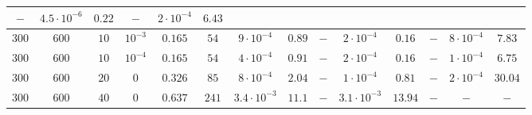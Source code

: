 \documentclass[twocolumn]{svjour3}
\begin{document}
\begin{table*}[!htp]
\begin{center}
\begin{tabular}{|c|c|c|c|c|c|c|c|c|c|c|c|c|c|}
\multicolumn{1}{|c}{$-$} & \multicolumn{1}{c}{$4.5\cdot10^{-6}$} & \multicolumn{1}{c|}{$0.22$} &
\multicolumn{1}{|c}{$-$} & \multicolumn{1}{c}{$2\cdot10^{-4}$} & \multicolumn{1}{c}{$6.43$} \\
\hline
\multicolumn{1}{c}{$300$} & \multicolumn{1}{c}{$600$} & \multicolumn{1}{c}{$10$} & \multicolumn{1}{c|}{$10^{-3}$} & $0.165$ & 
\multicolumn{1}{|c}{$54$} & \multicolumn{1}{c}{$9\cdot 10^{-4}$} & \multicolumn{1}{c|}{$0.89$} &
\multicolumn{1}{|c}{$-$} & \multicolumn{1}{c}{$2\cdot10^{-4}$} & \multicolumn{1}{c|}{$0.16$} &
\multicolumn{1}{|c}{$-$} & \multicolumn{1}{c}{$8\cdot10^{-4}$} & \multicolumn{1}{c}{$7.83$} \\
\hline
\multicolumn{1}{c}{$300$} & \multicolumn{1}{c}{$600$} & \multicolumn{1}{c}{$10$} & \multicolumn{1}{c|}{$10^{-4}$} & $0.165$ & 
\multicolumn{1}{|c}{$54$} & \multicolumn{1}{c}{$4\cdot 10^{-4}$} & \multicolumn{1}{c|}{$0.91$} &
\multicolumn{1}{|c}{$-$} & \multicolumn{1}{c}{$2\cdot10^{-4}$} & \multicolumn{1}{c|}{$0.16$} &
\multicolumn{1}{|c}{$-$} & \multicolumn{1}{c}{$1\cdot10^{-4}$} & \multicolumn{1}{c}{$6.75$} \\
\hline
\multicolumn{1}{c}{$300$} & \multicolumn{1}{c}{$600$} & \multicolumn{1}{c}{$20$} & \multicolumn{1}{c|}{$0$} & $0.326$ & 
\multicolumn{1}{|c}{$85$} & \multicolumn{1}{c}{$8\cdot 10^{-4}$} & \multicolumn{1}{c|}{$2.04$} &
\multicolumn{1}{|c}{$-$} & \multicolumn{1}{c}{$1\cdot10^{-4}$} & \multicolumn{1}{c|}{$0.81$} &
\multicolumn{1}{|c}{$-$} & \multicolumn{1}{c}{$2\cdot10^{-4}$} & \multicolumn{1}{c}{$30.04$} \\
\hline
\multicolumn{1}{c}{$300$} & \multicolumn{1}{c}{$600$} & \multicolumn{1}{c}{$40$} & \multicolumn{1}{c|}{$0$} & $0.637$ & 
\multicolumn{1}{|c}{$241$} & \multicolumn{1}{c}{$3.4\cdot 10^{-3}$} & \multicolumn{1}{c|}{$11.1$} &
\multicolumn{1}{|c}{$-$} & \multicolumn{1}{c}{$3.1 \cdot 10^{-3}$} & \multicolumn{1}{c|}{$13.94$} &
\multicolumn{1}{|c}{$-$} & \multicolumn{1}{c}{$-$} & \multicolumn{1}{c}{$-$} \\


\end{tabular}
\end{center}
\end{table*}
\end{document}
